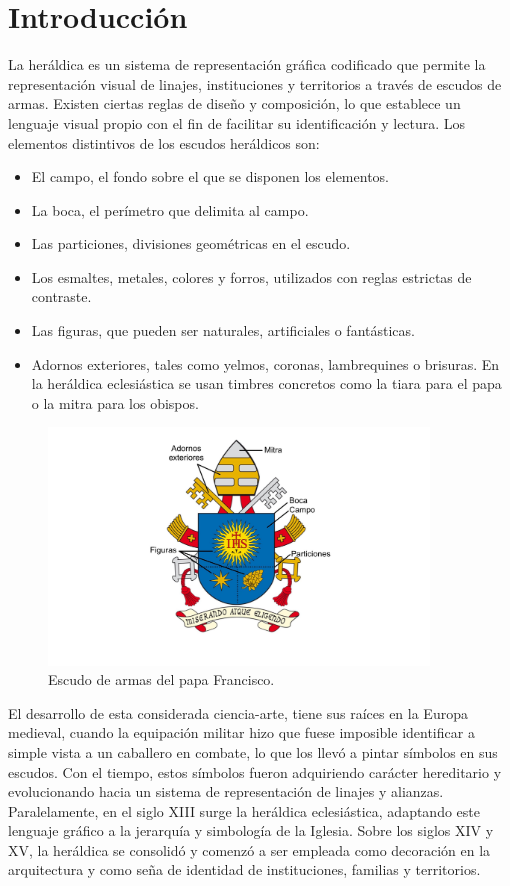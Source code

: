\chapter{Introducción}

La heráldica es un sistema de representación gráfica codificado que permite
la representación visual de linajes, instituciones y territorios a través de
escudos de armas. Existen ciertas reglas de diseño y composición, lo que establece
un lenguaje visual propio con el fin de facilitar su identificación y lectura.
Los elementos distintivos de los escudos heráldicos son:
\begin{itemize}
    \item El campo, el fondo sobre el que se disponen los elementos.
    \item La boca, el perímetro que delimita al campo.
    \item Las particiones, divisiones geométricas en el escudo.
    \item Los esmaltes, metales, colores y forros, utilizados con reglas estrictas
    de contraste.
    \item Las figuras, que pueden ser naturales, artificiales o fantásticas.
    \item Adornos exteriores, tales como yelmos, coronas, lambrequines o brisuras.
    En la heráldica eclesiástica se usan timbres concretos como la tiara para el papa
    o la mitra para los obispos.
\end{itemize}

\begin{figure}[h!]
    \centering
    \includegraphics[width=0.9\textwidth]{figuras/escudo-papa-francisco.png}
    \caption{Escudo de armas del papa Francisco.}
\end{figure}

El desarrollo de esta considerada ciencia-arte, tiene sus raíces en la Europa medieval,
cuando la equipación militar hizo que fuese imposible identificar a simple vista a un 
caballero en combate, lo que los llevó a pintar símbolos en sus escudos. Con el tiempo,
estos símbolos fueron adquiriendo carácter hereditario y evolucionando hacia un sistema
de representación de linajes y alianzas. Paralelamente, en el siglo XIII surge la 
heráldica eclesiástica, adaptando este lenguaje gráfico a la jerarquía y simbología
de la Iglesia. Sobre los siglos XIV y XV, la heráldica se consolidó y comenzó a ser 
empleada como decoración en la arquitectura y como seña de identidad de instituciones, 
familias y territorios. \cite{messia1990,delgado2019,pierrerer1858}


